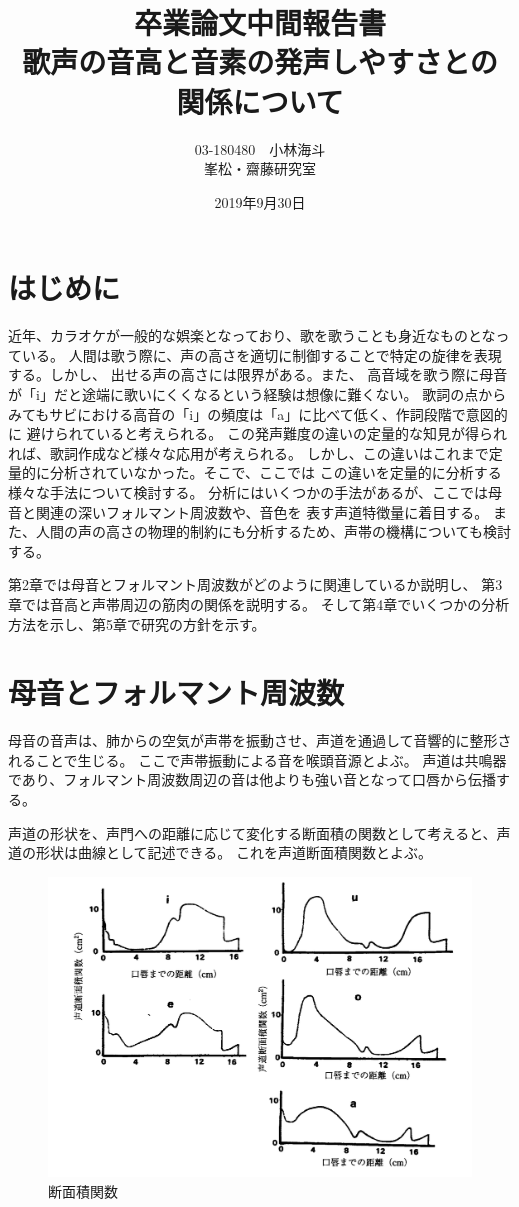 \documentclass[12ptj,a4j,dvipdfmx,uplatex, titlepage]{jsarticle}
\title{卒業論文中間報告書\vspace{1em}\\歌声の音高と音素の発声しやすさとの\\関係について}
\author{03-180480　小林海斗\vspace{1em}\\峯松・齋藤研究室}
\date{2019年9月30日}
\begin{document}
\maketitle

\tableofcontents
\clearpage

\section{はじめに}
近年、カラオケが一般的な娯楽となっており、歌を歌うことも身近なものとなっている。
人間は歌う際に、声の高さを適切に制御することで特定の旋律を表現する。しかし、
出せる声の高さには限界がある。また、
高音域を歌う際に母音が「i」だと途端に歌いにくくなるという経験は想像に難くない。
歌詞の点からみてもサビにおける高音の「i」の頻度は「a」に比べて低く\cite{popular_highest}、作詞段階で意図的に
避けられていると考えられる。
この発声難度の違いの定量的な知見が得られれば、歌詞作成など様々な応用が考えられる。
しかし、この違いはこれまで定量的に分析されていなかった。そこで、ここでは
この違いを定量的に分析する様々な手法について検討する。
分析にはいくつかの手法があるが、ここでは母音と関連の深いフォルマント周波数や、音色を
表す声道特徴量に着目する。
また、人間の声の高さの物理的制約にも分析するため、声帯の機構についても検討する。

第2章では母音とフォルマント周波数がどのように関連しているか説明し、
第3章では音高と声帯周辺の筋肉の関係を説明する。
そして第4章でいくつかの分析方法を示し、第5章で研究の方針を示す。

\section{母音とフォルマント周波数}
母音の音声は、肺からの空気が声帯を振動させ、声道を通過して音響的に整形されることで生じる。
ここで声帯振動による音を喉頭音源とよぶ。
声道は共鳴器であり、フォルマント周波数周辺の音は他よりも強い音となって口唇から伝播する。

声道の形状を、声門への距離に応じて変化する断面積の関数として考えると、声道の形状は曲線として記述できる。
これを声道断面積関数とよぶ\cite{science}。
\begin{figure}[htbp]
    \begin{center}
      \includegraphics[clip,width=12.0cm]{声道断面積関数.png}
      \caption{断面積関数\cite{science}}
      \label{fig:danmen}
    \end{center}
  \end{figure}
\end{document}
